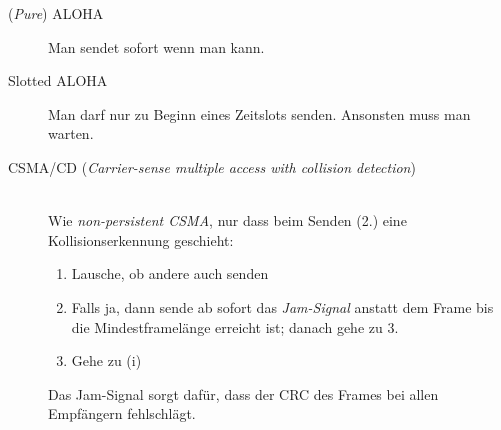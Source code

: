 \documentclass[a4paper]{article}
\begin{document}
\begin{description}
    \item[(\textit{Pure}) ALOHA] Man sendet sofort wenn man kann.
    \item[Slotted ALOHA] Man darf nur zu Beginn eines Zeitslots senden. Ansonsten muss man warten.
\end{description}
%
\begin{samepage}
\begin{description}
    \item[CSMA/CD (\textit{Carrier-sense multiple access with collision detection})] \hfill \\[8pt]
        Wie \textit{non-persistent CSMA}, nur dass beim Senden (2.) eine Kollisionserkennung geschieht:
        \begin{enumerate}[label=(\roman*)]
        \item Lausche, ob andere auch senden
        \item Falls ja, dann sende ab sofort das \textit{Jam-Signal} anstatt dem Frame bis die Mindestframelänge erreicht ist; danach gehe zu 3.
        \item Gehe zu (i)
    \end{enumerate}
    Das Jam-Signal sorgt dafür, dass der CRC des Frames bei allen Empfängern fehlschlägt.
\end{description}
\end{samepage}
\end{document}

